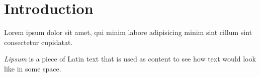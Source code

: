 
\chapter{Introduction}\label{ch: Introduction}
Lorem ipsum dolor sit amet, qui minim labore adipisicing minim sint cillum sint consectetur cupidatat.

\begin{definition}[Lipsum]\label{def: Lipsum}
\emph{Lipsum} is a piece of Latin text that is used as content to see how text would look like in some space.
\end{definition}

\endinput
